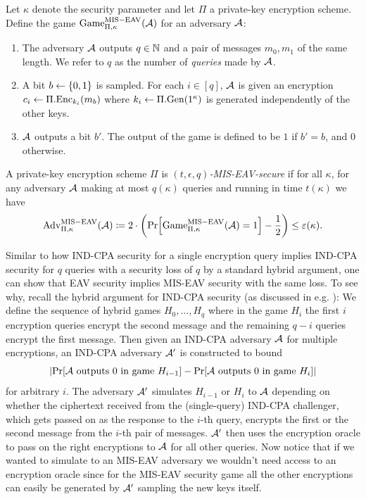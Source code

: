 \begin{definition}
	Let $\kappa$ denote the security parameter and let $\Pi$ a private-key encryption scheme. Define the game $\mathrm{Game}_{\Pi, \kappa}^{\mathrm{MIS-EAV}}(\mathcal{A})$ for an adversary $\mathcal{A}$:
	\begin{enumerate}[1.]
		\item The adversary $\mathcal{A}$ outputs $q \in \mathbb{N}$ and a pair of messages $m_0, m_1$ of the same length. We refer to $q$ as the number of \emph{queries} made by $\mathcal{A}$.
		\item A bit $b \leftarrow \{0, 1\}$ is sampled. For each $i \in [q]$, $\mathcal{A}$ is given an encryption $c_i \leftarrow \Pi.\mathrm{Enc}_{k_i}(m_b)$ where $k_i \leftarrow \Pi.\mathrm{Gen}(1^\kappa)$ is generated independently of the other keys.
		\item $\mathcal{A}$ outputs a bit $b'$. The output of the game is defined to be $1$ if $b' = b$, and $0$ otherwise.
	\end{enumerate}
\end{definition}

\begin{definition}
	A private-key encryption scheme $\Pi$ is \emph{$(t, \epsilon, q)$-MIS-EAV-secure} if for all $\kappa$, for any adversary $\mathcal{A}$ making at most $q(\kappa)$ queries and running in time $t(\kappa)$ we have
	\begin{align*}
		\advantage{\Pi}{\kappa}{MIS-EAV}(\adv) \coloneqq 2 \cdot \left(\pr{\game{\Pi}{\kappa}{MIS-EAV}(\adv) = 1} - \frac{1}{2}\right) \le \epsilon(\kappa).
	\end{align*}
\end{definition}

Similar to how IND-CPA security for a single encryption query implies IND-CPA security for $q$ queries with a security loss of $q$ by a standard hybrid argument, one can show that EAV security implies MIS-EAV security with the same loss. To see why, recall the hybrid argument for IND-CPA security (as discussed in e.g. \cite[Theorem 12.6]{introduction-to-modern-cryptography}): We define the sequence of hybrid games $H_0, \ldots, H_q$ where in the game $H_i$ the first $i$ encryption queries encrypt the second message and the remaining $q - i$ queries encrypt the first message. Then given an IND-CPA adversary $\mathcal{A}$ for multiple encryptions, an IND-CPA adversary $\mathcal{A}'$ is constructed to bound
\[
	\abs*{\pr{\adv \text{ outputs } 0 \text{ in game } H_{i - 1}} - \pr{\adv \text{ outputs } 0 \text{ in game } H_{i}}}
\]
for arbitrary $i$.
The adversary $\mathcal{A}'$ simulates $H_{i - 1}$ or $H_{i}$ to $\mathcal{A}$ depending on whether the ciphertext received from the (single-query) IND-CPA challenger, which gets passed on as the response to the $i$-th query, encrypts the first or the second message from the $i$-th pair of messages. $\mathcal{A}'$ then uses the encryption oracle to pass on the right encryptions to $\mathcal{A}$ for all other queries. Now notice that if we wanted to simulate to an MIS-EAV adversary we wouldn't need access to an encryption oracle since for the MIS-EAV security game all the other encryptions can easily be generated by $\mathcal{A}'$ sampling the new keys itself.


